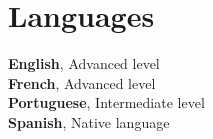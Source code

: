 	\section{Languages} 

    \textbf{English}, Advanced level            		\vspace{0mm}\\%
    \textbf{French}, Advanced level		           		\vspace{0mm}\\%
	\textbf{Portuguese}, Intermediate level 	        \vspace{0mm}\\%
    \textbf{Spanish}, Native language            		\vspace{0mm}\\%
   